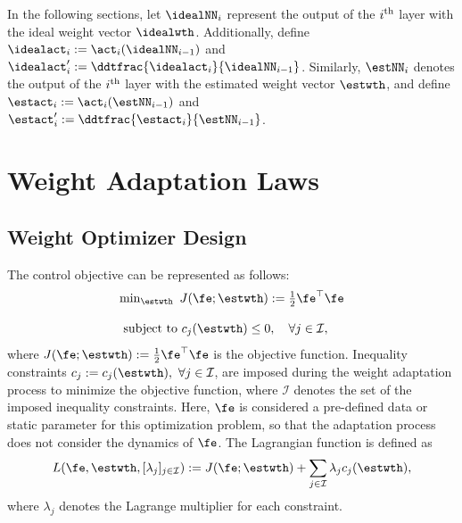 \documentclass[lettersize,journal]{IEEEtran}
\begin{document}
In the following sections, let $\idealNN_i$ represent the output of the $i\textsuperscript{th}$ layer with the ideal weight vector $\idealwth$. 
Additionally, define $\idealact_i:=\act_i(\idealNN_{i-1})$ and ${\idealact}'_i:= \ddtfrac{\idealact_i}{\idealNN_{i-1}}$. 
Similarly, $\estNN_i$ denotes the output of the $i\textsuperscript{th}$ layer with the estimated weight vector $\estwth$, and define $\estact_i:=\act_i(\estNN_{i-1})$ and $\estact_i':= \ddtfrac{\estact_i}{\estNN_{i-1}}$.

\section{Weight Adaptation Laws}\label{sec:adap_laws}

\subsection{Weight Optimizer Design}\label{sec:sub:weight optimizer}

The control objective can be represented as follows:
\begin{equation}
    \begin{matrix}
        \min_{\estwth} \ J(\fe;\estwth):= 
        \tfrac{1}{2} \fe^\top \fe
        \\ \\
        \begin{aligned}
        \text{subject to }&c_{j}(\estwth) 
        \le0, \quad \forall j\in\mathcal{I},
        \end{aligned}
    \end{matrix}
    \label{eq:opt:problem1}
\end{equation}
where $J(\fe;\estwth):= \tfrac{1}{2} \fe^\top \fe$ is the objective function.
Inequality constraints $c_j:=c_j(\estwth),\ \forall j\in\mathcal{I}$, are imposed during the weight adaptation process to minimize the objective function, where $\mathcal I$ denotes the set of the imposed inequality constraints. 
Here, $\fe$ is considered a pre-defined data or static parameter for this optimization problem, so that the adaptation process does not consider the dynamics of $\fe$.
The Lagrangian function is defined as
\begin{equation}
    L(
        \fe,\estwth,[\lambda_j]_{j\in\mathcal I}
    ) 
    := 
    J(\fe;\estwth) 
    + 
    \sum_{j\in\mathcal I}
    \lambda_{j}
    c_{j}(\estwth)
    ,
    \label{eq:lagrangian}
\end{equation}
where $\lambda_j$ denotes the Lagrange multiplier for each constraint.
\end{document}
